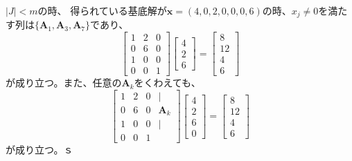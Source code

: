 \documentclass{jsarticle}
\begin{document}
$|J|<m$の時、
得られている基底解が$\bm{x}=(4,0,2,0,0,0,6)$の時、$x_j \neq 0$を満たす列は$\{\bm{A}_1,\bm{A}_3,\bm{A}_7\}$であり、
\begin{equation}
  \left[\begin{array}{lllllll}
  1 & 2 & 0 \\
  0 & 6 & 0 \\
  1 & 0 & 0 \\
  0 & 0 & 1
  \end{array}\right] 
  \left[\begin{array}{r}
    4 \\
    2 \\
    6
    \end{array}\right]
  =\left[\begin{array}{r}
  8 \\
  12 \\
  4 \\
  6
  \end{array}\right]
\end{equation}
が成り立つ。また、任意の$\bm{A}_k$をくわえても、
\begin{equation}
  \left[\begin{array}{lllllll}
  1 & 2 & 0 &\mid \\
  0 & 6 & 0 & \bm{A}_k\\
  1 & 0 & 0 &\mid\\
  0 & 0 & 1 &
  \end{array}\right] 
  \left[\begin{array}{r}
    4 \\
    2 \\
    6 \\
    0
    \end{array}\right]
  =\left[\begin{array}{r}
  8 \\
  12 \\
  4 \\
  6
  \end{array}\right]
\end{equation}
が成り立つ。ｓ
\end{document}

